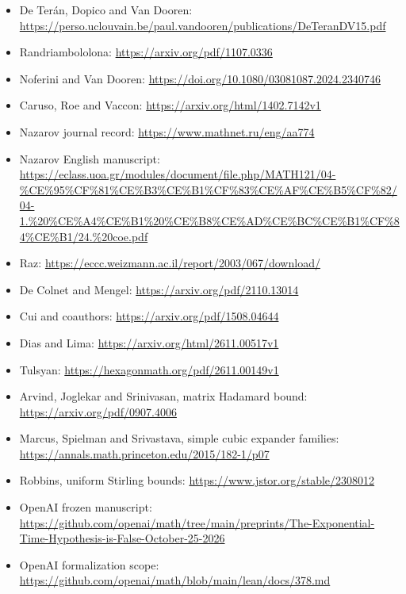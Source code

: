 \documentclass[
  11pt,
]{article}
\providecommand{\tightlist}{%
  \setlength{\itemsep}{0pt}\setlength{\parskip}{0pt}}
\begin{document}
\begin{itemize}
\tightlist
\item
  De Terán, Dopico and Van Dooren:
  \url{https://perso.uclouvain.be/paul.vandooren/publications/DeTeranDV15.pdf}
\item
  Randriambololona: \url{https://arxiv.org/pdf/1107.0336}
\item
  Noferini and Van Dooren:
  \url{https://doi.org/10.1080/03081087.2024.2340746}
\item
  Caruso, Roe and Vaccon: \url{https://arxiv.org/html/1402.7142v1}
\item
  Nazarov journal record: \url{https://www.mathnet.ru/eng/aa774}
\item
  Nazarov English manuscript:
  \url{https://eclass.uoa.gr/modules/document/file.php/MATH121/04-\%CE\%95\%CF\%81\%CE\%B3\%CE\%B1\%CF\%83\%CE\%AF\%CE\%B5\%CF\%82/04-1.\%20\%CE\%A4\%CE\%B1\%20\%CE\%B8\%CE\%AD\%CE\%BC\%CE\%B1\%CF\%84\%CE\%B1/24.\%20coe.pdf}
\item
  Raz: \url{https://eccc.weizmann.ac.il/report/2003/067/download/}
\item
  De Colnet and Mengel: \url{https://arxiv.org/pdf/2110.13014}
\item
  Cui and coauthors: \url{https://arxiv.org/pdf/1508.04644}
\item
  Dias and Lima: \url{https://arxiv.org/html/2611.00517v1}
\item
  Tulsyan: \url{https://hexagonmath.org/pdf/2611.00149v1}
\item
  Arvind, Joglekar and Srinivasan, matrix Hadamard bound:
  \url{https://arxiv.org/pdf/0907.4006}
\item
  Marcus, Spielman and Srivastava, simple cubic expander families:
  \url{https://annals.math.princeton.edu/2015/182-1/p07}
\item
  Robbins, uniform Stirling bounds:
  \url{https://www.jstor.org/stable/2308012}
\item
  OpenAI frozen manuscript:
  \url{https://github.com/openai/math/tree/main/preprints/The-Exponential-Time-Hypothesis-is-False-October-25-2026}
\item
  OpenAI formalization scope:
  \url{https://github.com/openai/math/blob/main/lean/docs/378.md}
\end{itemize}
\end{document}
